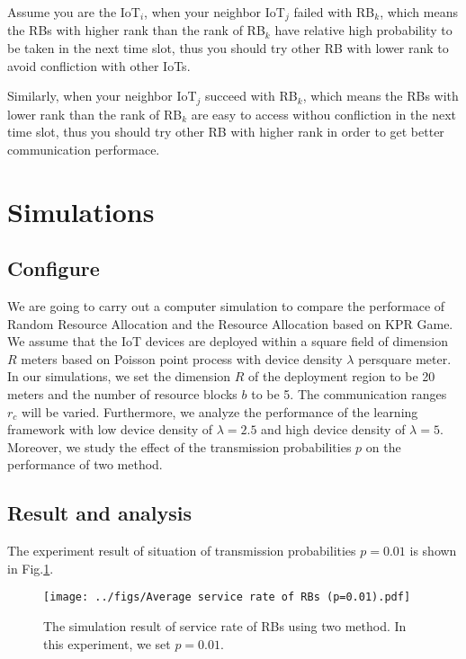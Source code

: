 \documentclass[runningheads]{llncs}
\begin{document}
Assume you are the IoT$_i$, when your neighbor IoT$_j$ failed with RB$_k$, 
which means the RBs with higher rank than the rank of RB$_k$ 
have relative high probability to be taken in the next time slot, thus you should try other RB with lower rank to avoid confliction with other IoTs.

Similarly, when your neighbor IoT$_j$ succeed with RB$_k$, 
which means the RBs with lower rank than the rank of RB$_k$ 
are easy to access withou confliction in the next time slot, thus you should try other RB with higher rank in order to get better communication performace.

\section{Simulations}

\subsection{Configure}

We are going to carry out a computer simulation to compare the performace of Random Resource Allocation
and the Resource Allocation based on KPR Game. 
We assume that the IoT devices are deployed within a square field of dimension $R$ meters
based on Poisson point process with device density $λ$ persquare meter. 
In our simulations, we set the dimension $R$ of the
deployment region to be 20 meters and the number of resource
blocks $b$ to be 5. The communication ranges $r_c$ will be varied. Furthermore, we analyze the performance of the
learning framework with low device density of $\lambda = 2.5$ and
high device density of $\lambda = 5$. Moreover, we study the effect
of the transmission probabilities $p$ on the performance of two method. 

\subsection{Result and analysis}

The experiment result of situation of transmission probabilities $p=0.01$ is shown in Fig.\ref{fig:result1}.

\begin{figure}
    \centering
    \texttt{[image: ../figs/Average service rate of RBs (p=0.01).pdf]}
    \caption{The simulation result of service rate of RBs using two method. In this experiment, we set $p=0.01$.} 
    \label{fig:result1}
\end{figure}
\end{document}
